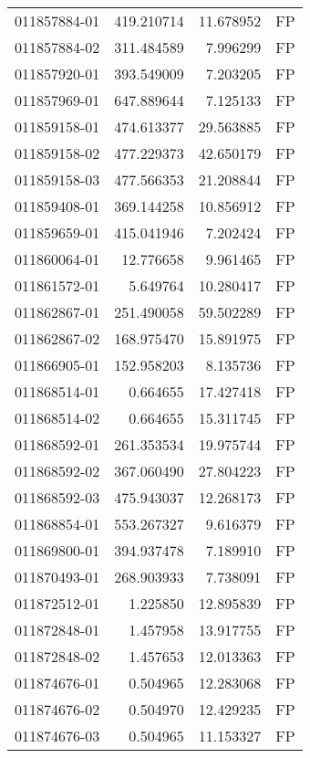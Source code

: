\begin{tabular}{lrrl}
011857884-01 &  419.210714 &      11.678952 &   FP \\
011857884-02 &  311.484589 &       7.996299 &   FP \\
011857920-01 &  393.549009 &       7.203205 &   FP \\
011857969-01 &  647.889644 &       7.125133 &   FP \\
011859158-01 &  474.613377 &      29.563885 &   FP \\
011859158-02 &  477.229373 &      42.650179 &   FP \\
011859158-03 &  477.566353 &      21.208844 &   FP \\
011859408-01 &  369.144258 &      10.856912 &   FP \\
011859659-01 &  415.041946 &       7.202424 &   FP \\
011860064-01 &   12.776658 &       9.961465 &   FP \\
011861572-01 &    5.649764 &      10.280417 &   FP \\
011862867-01 &  251.490058 &      59.502289 &   FP \\
011862867-02 &  168.975470 &      15.891975 &   FP \\
011866905-01 &  152.958203 &       8.135736 &   FP \\
011868514-01 &    0.664655 &      17.427418 &   FP \\
011868514-02 &    0.664655 &      15.311745 &   FP \\
011868592-01 &  261.353534 &      19.975744 &   FP \\
011868592-02 &  367.060490 &      27.804223 &   FP \\
011868592-03 &  475.943037 &      12.268173 &   FP \\
011868854-01 &  553.267327 &       9.616379 &   FP \\
011869800-01 &  394.937478 &       7.189910 &   FP \\
011870493-01 &  268.903933 &       7.738091 &   FP \\
011872512-01 &    1.225850 &      12.895839 &   FP \\
011872848-01 &    1.457958 &      13.917755 &   FP \\
011872848-02 &    1.457653 &      12.013363 &   FP \\
011874676-01 &    0.504965 &      12.283068 &   FP \\
011874676-02 &    0.504970 &      12.429235 &   FP \\
011874676-03 &    0.504965 &      11.153327 &   FP \\

\end{tabular}
